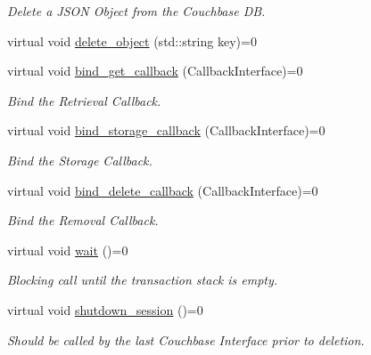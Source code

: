 \begin{DoxyCompactItemize}
\begin{DoxyCompactList}\small\item\em Delete a J\-S\-O\-N Object from the Couchbase D\-B. \end{DoxyCompactList}\item 
virtual void \hyperlink{classCouchbaseInterface_aa45552deeb14c1eafca33eaccb85e094}{delete\-\_\-object} (std\-::string key)=0
\item 
virtual void \hyperlink{classCouchbaseInterface_a88980b99dc329e5cd02f240ddbbba1ca}{bind\-\_\-get\-\_\-callback} (Callback\-Interface)=0
\begin{DoxyCompactList}\small\item\em Bind the Retrieval Callback. \end{DoxyCompactList}\item 
virtual void \hyperlink{classCouchbaseInterface_a54a056865fc0caa456413b97c6cfb030}{bind\-\_\-storage\-\_\-callback} (Callback\-Interface)=0
\begin{DoxyCompactList}\small\item\em Bind the Storage Callback. \end{DoxyCompactList}\item 
virtual void \hyperlink{classCouchbaseInterface_a48f4eb1863cc7750c75de7227f11ad81}{bind\-\_\-delete\-\_\-callback} (Callback\-Interface)=0
\begin{DoxyCompactList}\small\item\em Bind the Removal Callback. \end{DoxyCompactList}\item 
\hypertarget{classCouchbaseInterface_ae901a3e383a82044679d0b77702c7e2c}{virtual void \hyperlink{classCouchbaseInterface_ae901a3e383a82044679d0b77702c7e2c}{wait} ()=0}\label{classCouchbaseInterface_ae901a3e383a82044679d0b77702c7e2c}

\begin{DoxyCompactList}\small\item\em Blocking call until the transaction stack is empty. \end{DoxyCompactList}\item 
\hypertarget{classCouchbaseInterface_afa5795fb0d9f34b9069d903c75ca84fe}{virtual void \hyperlink{classCouchbaseInterface_afa5795fb0d9f34b9069d903c75ca84fe}{shutdown\-\_\-session} ()=0}\label{classCouchbaseInterface_afa5795fb0d9f34b9069d903c75ca84fe}

\begin{DoxyCompactList}\small\item\em Should be called by the last Couchbase Interface prior to deletion. \end{DoxyCompactList}\end{DoxyCompactItemize}


